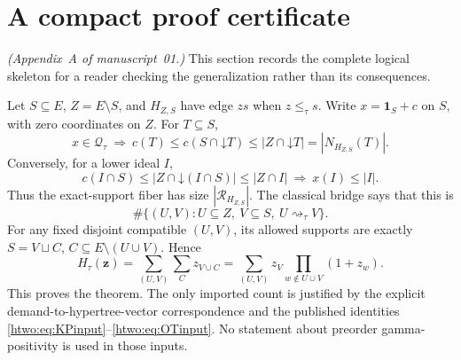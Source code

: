 \documentclass[11pt]{article}
\numberwithin{equation}{section}
\theoremstyle{definition}
\newcommand{\Qt}{\mathcal Q_\tau}
\newcommand{\one}{\mathbf 1}
\newcommand{\down}{\mathord\downarrow}
\newcommand{\zv}{\mathbf z}
\newcommand{\match}{\rightsquigarrow}
\begin{document}
\section{A compact proof certificate}\label{gam:gv:sec:certificate}
\noindent\emph{(Appendix~A of manuscript~01.)}
This section records the complete logical skeleton for a reader checking
the generalization rather than its consequences.

Let $S\subseteq E$, $Z=E\setminus S$, and $H_{Z,S}$ have edge $zs$ when
$z\le_\tau s$. Write $x=\one_S+c$ on $S$, with zero coordinates on $Z$.
For $T\subseteq S$,
\[
 x\in\Qt
 \ \Longrightarrow\
 c(T)\le c(S\cap\down T)
 \le |Z\cap\down T|=|N_{H_{Z,S}}(T)|.
\]
Conversely, for a lower ideal $I$,
\[
 c(I\cap S)\le |Z\cap\down(I\cap S)|\le |Z\cap I|
 \ \Longrightarrow\ x(I)\le|I|.
\]
Thus the exact-support fiber has size $|\mathcal R_{H_{Z,S}}|$.
The classical bridge says that this is
\[
 \#\{(U,V):U\subseteq Z,\ V\subseteq S,\ U\match_\tau V\}.
\]
For any fixed disjoint compatible $(U,V)$, its allowed supports are exactly
$S=V\sqcup C$, $C\subseteq E\setminus(U\cup V)$. Hence
\[
 H_\tau(\zv)
 =\sum_{(U,V)}\sum_C z_{V\cup C}
 =\sum_{(U,V)}z_V\prod_{w\notin U\cup V}(1+z_w).
\]
This proves the theorem. The only imported count is justified by the
explicit demand-to-hypertree-vector correspondence and the published
identities \eqref{htwo:eq:KPinput}--\eqref{htwo:eq:OTinput}. No statement about
preorder gamma-positivity is used in those inputs.
\end{document}
